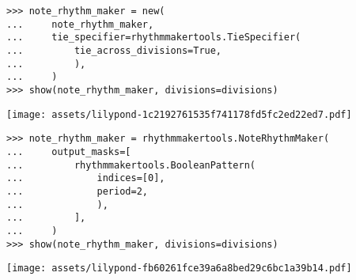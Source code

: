 \begin{comment}
<abjad>
note_rhythm_maker = new(
    note_rhythm_maker,
    tie_specifier=rhythmmakertools.TieSpecifier(
        tie_across_divisions=True,
        ),
    )
show(note_rhythm_maker, divisions=divisions)
</abjad>
\end{comment}

\begin{singlespacing}
\vspace{-0.5\baselineskip}
\begin{lstlisting}
>>> note_rhythm_maker = new(
...     note_rhythm_maker,
...     tie_specifier=rhythmmakertools.TieSpecifier(
...         tie_across_divisions=True,
...         ),
...     )
>>> show(note_rhythm_maker, divisions=divisions)
\end{lstlisting}
\noindent\texttt{[image: assets/lilypond-1c2192761535f741178fd5fc2ed22ed7.pdf]}
\end{singlespacing}

\begin{comment}
<abjad>
note_rhythm_maker = rhythmmakertools.NoteRhythmMaker(
    output_masks=[
        rhythmmakertools.BooleanPattern(
            indices=[0],
            period=2,
            ),
        ],
    )
show(note_rhythm_maker, divisions=divisions)
</abjad>
\end{comment}

\begin{singlespacing}
\vspace{-0.5\baselineskip}
\begin{lstlisting}
>>> note_rhythm_maker = rhythmmakertools.NoteRhythmMaker(
...     output_masks=[
...         rhythmmakertools.BooleanPattern(
...             indices=[0],
...             period=2,
...             ),
...         ],
...     )
>>> show(note_rhythm_maker, divisions=divisions)
\end{lstlisting}
\noindent\texttt{[image: assets/lilypond-fb60261fce39a6a8bed29c6bc1a39b14.pdf]}
\end{singlespacing}

\begin{comment}
<abjad>
note_rhythm_maker = rhythmmakertools.NoteRhythmMaker(
    output_masks=[
        rhythmmakertools.BooleanPattern(
            indices=[0],
            period=1,
            ),
        ],
    )
show(note_rhythm_maker, divisions=divisions)
</abjad>
\end{comment}

